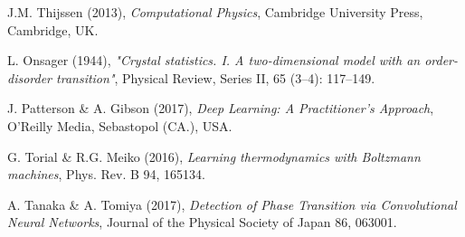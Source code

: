 \documentclass[10 pt, a4paper]{article}
\begin{document}
\begin{thebibliography}{99}

J.M. Thijssen (2013), \textit{Computational Physics}, Cambridge University Press, Cambridge, UK.

L. Onsager (1944), \textit{"Crystal statistics. I. A two-dimensional model with an order-disorder transition"}, Physical Review, Series II, 65 (3–4): 117–149.

J. Patterson \& A. Gibson (2017), \textit{Deep Learning: A Practitioner's Approach}, O'Reilly Media, Sebastopol (CA.), USA.

G. Torial \& R.G. Meiko (2016), \textit{Learning thermodynamics with Boltzmann machines}, Phys. Rev. B 94, 165134.



A. Tanaka \& A. Tomiya (2017), \textit{Detection of Phase Transition via Convolutional Neural Networks}, Journal of the Physical Society of Japan 86, 063001.


\end{thebibliography}
\end{document}
